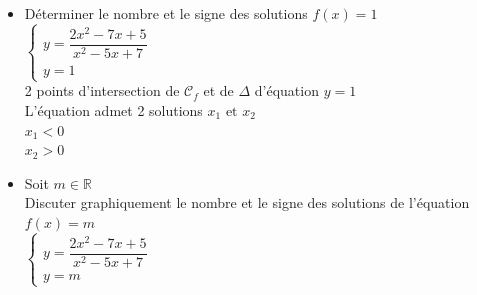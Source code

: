 \begin{itemize}
    \item Déterminer le nombre et le signe des solutions $f(x) =1$ \\
    $\begin{cases}
        y = \dfrac{2x^2 -7x +5}{x^2 -5x +7} \\
        y = 1
    \end{cases}$ \\
    
    2 points d'intersection de $\mathscr{C}_f$ et de $\Delta$ d'équation $y=1$ \\
    
    L'équation admet 2 solutions $x_1 \text{ et } x_2$ \\
    
    $x_1 < 0 $\\
    $x_2 > 0 $\\
  
    
    \item Soit $m \in \mathbb{R}$ \\
    
    Discuter graphiquement le nombre et le signe des solutions de l'équation $f(x) = m $\\
    
    $\begin{cases}
        y = \dfrac{2x^2 -7x +5}{x^2 -5x +7} \\
        y = m
    \end{cases}$ \\

\bigskip


\end{itemize}
